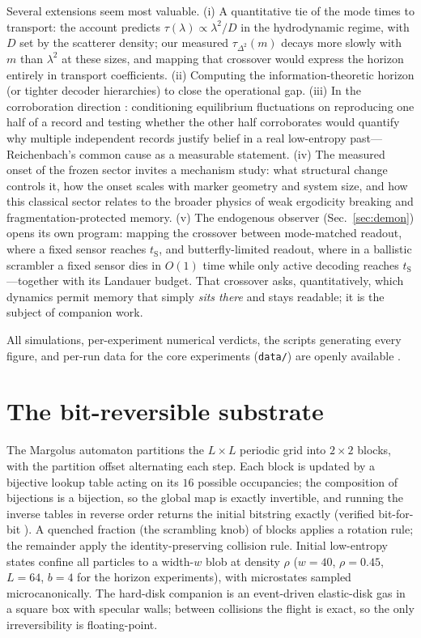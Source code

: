 \documentclass[aps,pre,twocolumn,superscriptaddress,nofootinbib,longbibliography]{revtex4-2}
\newcommand{\tS}{t_{\mathrm{S}}}
\begin{document}
Several extensions seem most valuable. (i) A quantitative tie of the mode times to
transport: the account predicts $\tau(\lambda)\propto\lambda^2/D$ in the hydrodynamic
regime, with $D$ set by the scatterer density; our measured $\tau_{\Delta^2}(m)$ decays
more slowly with $m$ than $\lambda^2$ at these sizes, and mapping that crossover would
express the horizon entirely in transport coefficients. (ii) Computing the
information-theoretic horizon (or tighter decoder hierarchies) to close the operational
gap. (iii) In the corroboration direction \cite{repo}: conditioning equilibrium
fluctuations on reproducing one half of a record and testing whether the other half
corroborates would quantify why multiple independent records justify belief in a real
low-entropy past---Reichenbach's common cause as a measurable statement. (iv) The measured
onset of the frozen sector invites a mechanism study: what structural change controls it,
how the onset scales with marker geometry and system size, and how this classical sector
relates to the broader physics of weak ergodicity breaking and fragmentation-protected
memory. (v) The endogenous observer (Sec.~\ref{sec:demon}) opens its own program: mapping
the crossover between mode-matched readout, where a fixed sensor reaches $\tS$, and
butterfly-limited readout, where in a ballistic scrambler a fixed sensor dies in $O(1)$
time while only active decoding reaches $\tS$---together with its Landauer budget. That
crossover asks, quantitatively, which dynamics permit memory that simply \emph{sits there}
and stays readable; it is the subject of companion work.

\begin{acknowledgments}
All simulations, per-experiment numerical verdicts, the scripts generating every figure,
and per-run data for the core experiments (\texttt{data/}) are openly available
\cite{repo}.
\end{acknowledgments}

\appendix

\section{The bit-reversible substrate}
\label{app:model}

The Margolus automaton partitions the $L\times L$ periodic grid into $2\times2$ blocks, with
the partition offset alternating each step. Each block is updated by a bijective lookup
table acting on its $16$ possible occupancies; the composition of bijections is a bijection,
so the global map is exactly invertible, and running the inverse tables in reverse order
returns the initial bitstring exactly (verified bit-for-bit \cite{repo}). A
quenched fraction (the scrambling knob) of blocks applies a rotation rule; the remainder
apply the identity-preserving collision rule. Initial low-entropy states confine all
particles to a width-$w$ blob at density $\rho$ ($w=40$, $\rho=0.45$, $L=64$, $b=4$ for the
horizon experiments), with microstates sampled microcanonically. The hard-disk companion is
an event-driven elastic-disk gas in a square box with specular walls; between collisions the
flight is exact, so the only irreversibility is floating-point.
\end{document}
